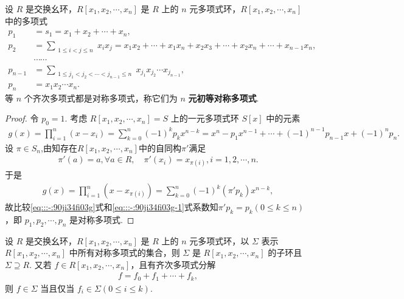 \documentclass[../../main.tex]{subfiles}%
\begin{document}
\begin{lemma}\label{lemma:抽象代数--引理2.3.1}
设 \( R \) 是交换幺环，\( R[x_1, x_2, \cdots, x_n] \) 是 \( R \) 上的 \( n \) 元多项式环，\( R[x_1, x_2, \cdots, x_n] \) 中的多项式
\begin{align*}
p_1 &= s_1 = x_1 + x_2 + \cdots + x_n, \\
p_2 &= \sum_{\substack{1 \leqslant i < j \leqslant n}} x_i x_j = x_1 x_2 + \cdots + x_1 x_n + x_2 x_3 + \cdots + x_2 x_n + \cdots + x_{n-1} x_n, \\
&\cdots\cdots \\
p_{n-1} &= \sum_{\substack{1 \leqslant j_1 < j_2 < \cdots < j_{n-1} \leqslant n}} x_{j_1} x_{j_2} \cdots x_{j_{n-1}} , \\
p_n &= x_1 x_2 \cdots x_n.
\end{align*}
等 \( n \) 个齐次多项式都是对称多项式，称它们为 \( n \) \textbf{元初等对称多项式}.
\end{lemma}
\begin{proof}

令 \( p_0 = 1 \). 考虑 \( R[x_1, x_2, \cdots, x_n] = S \) 上的一元多项式环 \( S[x] \) 中的元素
\begin{align}\label{eq:::-:90ji34fi03g}
g(x) = \prod_{i=1}^n (x - x_i) = \sum_{k=0}^n (-1)^k p_k x^{n - k} = x^n - p_1 x^{n - 1} + \cdots + (-1)^{n - 1} p_{n - 1} x + (-1)^n p_n.
\end{align}
设 \( \pi \in S_n \),由知存在$R[x_1,x_2,\cdots,x_n]$中的自同构$\pi'$满足
\begin{align*}
\pi'(a) = a, \forall a \in R, \quad \pi'(x_i) = x_{\pi(i)}, i = 1, 2, \cdots, n.
\end{align*}
于是
\begin{align}\label{eq:::-:90ji34fi03g-1}
g(x) = \prod_{i=1}^n (x - x_{\pi(i)}) = \sum_{k=0}^n (-1)^k (\pi' p_k) x^{n - k},
\end{align}
故比较\eqref{eq:::-:90ji34fi03g}式和\eqref{eq:::-:90ji34fi03g-1}式系数知\( \pi' p_k = p_k (0 \leqslant k \leqslant n) \)，即 \( p_1, p_2, \cdots, p_n \) 是对称多项式.

\end{proof}

\begin{lemma}\label{lemma:抽象代数--引理2.3.2}
设 \( R \) 是交换幺环，\( R[x_1, x_2, \cdots, x_n] \) 是 \( R \) 上的 \( n \) 元多项式环，以 \( \Sigma \) 表示 \( R[x_1, x_2, \cdots, x_n] \) 中所有对称多项式的集合，则 \( \Sigma \) 是 \( R[x_1, x_2, \cdots, x_n] \) 的子环且 \( \Sigma \supseteq R \). 又若 \( f \in R[x_1, x_2, \cdots, x_n] \)，且有齐次多项式分解
\begin{align*}
f = f_0 + f_1 + \cdots + f_k,
\end{align*}
则 \( f \in \Sigma \) 当且仅当 \( f_i \in \Sigma (0 \leqslant i \leqslant k) \).
\end{lemma}
\end{document}
